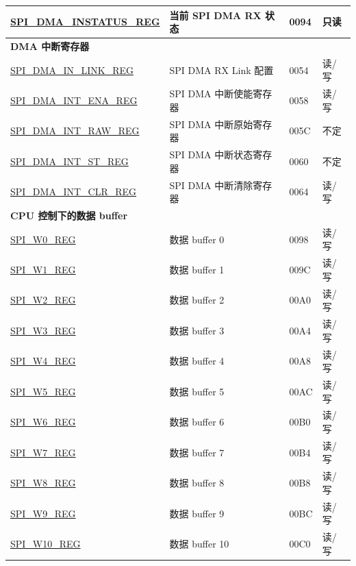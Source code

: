 \begin{longtable}{ | p{6cm} | p{7.2cm} | p{1.3cm} | p{1cm} | }
\hyperref[regdesc:SPIDMAINSTATUSREG]{SPI\_DMA\_INSTATUS\_REG} & 当前 SPI DMA RX 状态 & \hexprefix{}0094 & 只读 \\ \hline
\multicolumn{4}{|l|}{\textbf{DMA 中断寄存器}} \\ \hline
\hyperref[regdesc:SPIDMAINLINKREG]{SPI\_DMA\_IN\_LINK\_REG} & SPI DMA RX Link 配置 & \hexprefix{}0054 &读/写 \\ \hline
\hyperref[regdesc:SPIDMAINTENAREG]{SPI\_DMA\_INT\_ENA\_REG} & SPI DMA 中断使能寄存器 & \hexprefix{}0058 &读/写 \\ \hline
\hyperref[regdesc:SPIDMAINTRAWREG]{SPI\_DMA\_INT\_RAW\_REG} & SPI DMA 中断原始寄存器 & \hexprefix{}005C & 不定 \\ \hline
\hyperref[regdesc:SPIDMAINTSTREG]{SPI\_DMA\_INT\_ST\_REG} & SPI DMA 中断状态寄存器 & \hexprefix{}0060 & 不定 \\ \hline
\hyperref[regdesc:SPIDMAINTCLRREG]{SPI\_DMA\_INT\_CLR\_REG} & SPI DMA 中断清除寄存器 & \hexprefix{}0064 &读/写 \\ \hline
\multicolumn{4}{|l|}{\textbf{CPU 控制下的数据 buffer}} \\ \hline
\hyperref[regdesc:SPIW0REG]{SPI\_W0\_REG} & 数据 buffer 0 & \hexprefix{}0098 &读/写 \\ \hline
\hyperref[regdesc:SPIW1REG]{SPI\_W1\_REG} & 数据 buffer 1 & \hexprefix{}009C &读/写 \\ \hline
\hyperref[regdesc:SPIW2REG]{SPI\_W2\_REG} & 数据 buffer 2 & \hexprefix{}00A0 &读/写 \\ \hline
\hyperref[regdesc:SPIW3REG]{SPI\_W3\_REG} & 数据 buffer 3 & \hexprefix{}00A4 &读/写 \\ \hline
\hyperref[regdesc:SPIW4REG]{SPI\_W4\_REG} & 数据 buffer 4 & \hexprefix{}00A8 &读/写 \\ \hline
\hyperref[regdesc:SPIW5REG]{SPI\_W5\_REG} & 数据 buffer 5 & \hexprefix{}00AC &读/写 \\ \hline
\hyperref[regdesc:SPIW6REG]{SPI\_W6\_REG} & 数据 buffer 6 & \hexprefix{}00B0 &读/写 \\ \hline
\hyperref[regdesc:SPIW7REG]{SPI\_W7\_REG} & 数据 buffer 7 & \hexprefix{}00B4 &读/写 \\ \hline
\hyperref[regdesc:SPIW8REG]{SPI\_W8\_REG} & 数据 buffer 8 & \hexprefix{}00B8 &读/写 \\ \hline
\hyperref[regdesc:SPIW9REG]{SPI\_W9\_REG} & 数据 buffer 9 & \hexprefix{}00BC &读/写 \\ \hline
\hyperref[regdesc:SPIW10REG]{SPI\_W10\_REG} & 数据 buffer 10 & \hexprefix{}00C0 &读/写 \\ \hline

\end{longtable}
